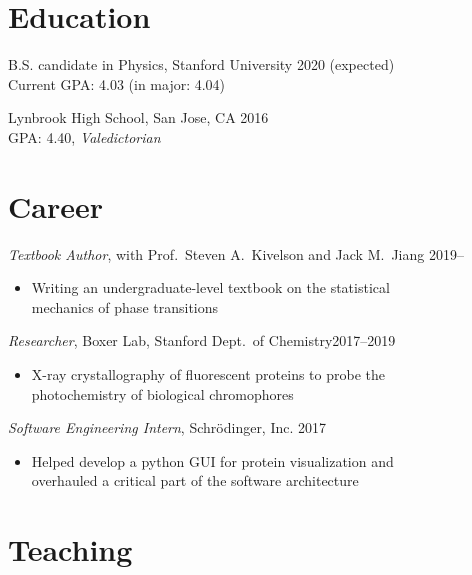 \documentclass[margin,11pt]{res}
\newenvironment{myitemize}
{ \vspace{-1.5\topsep} \begin{itemize} \setlength\itemsep{0em}}
{ \end{itemize} \vspace{-1.0\topsep}}
\begin{document}
\address{jeffjar@stanford.edu --- \url{https://stanford.edu/~jeffjar}}

\begin{resume}

\section{Education}

B.S. candidate in Physics, Stanford University \hfill 2020 (expected) \\
Current GPA: 4.03 (in major: 4.04)
 
Lynbrook High School, San Jose, CA \hfill 2016 \\
GPA: 4.40, \textit{Valedictorian}

\section{Career}

\textit{Textbook Author}, with Prof.\ Steven A.\ Kivelson and Jack M.\ Jiang  \hfill 2019--\\
\begin{myitemize}
    \item Writing an undergraduate-level textbook on the statistical\\
        mechanics of phase transitions
\end{myitemize}

\textit{Researcher}, Boxer Lab, Stanford Dept.\ of Chemistry\hfill 2017--2019 \\
\begin{myitemize}
    \item X-ray crystallography of fluorescent proteins to probe the\\ photochemistry of biological chromophores
\end{myitemize}

\textit{Software Engineering Intern}, Schr{\"o}dinger, Inc. \hfill 2017 \\
\begin{myitemize}
    \item Helped develop a python GUI for protein visualization and \\overhauled a critical part of the software architecture
\end{myitemize}

\section{Teaching}


\end{resume}
\end{document}
